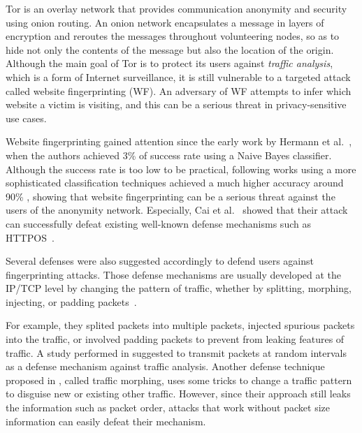 

Tor is an overlay network that provides communication anonymity and security using onion routing.
An onion network encapsulates a message in layers of encryption and reroutes the messages throughout volunteering nodes, so as to hide not only the contents of the message but also the location of the origin.
Although the main goal of Tor is to protect its users against {\it traffic analysis}, which is a form of Internet surveillance, it is still vulnerable to a targeted attack called website fingerprinting (WF).
An adversary of WF attempts to infer which website a victim is visiting, and this can be a serious threat in privacy-sensitive use cases.

Website fingerprinting gained attention since the early work by Hermann et al.~\cite{hermann}, when the authors achieved 3\% of success rate using a Naive Bayes classifier.
Although the success rate is too low to be practical, following works using a more sophisticated classification techniques achieved a much higher accuracy around 90\% \cite{panchenko11, wang2013improved, cai2012touching}, showing that website fingerprinting can be a serious threat against the users of the anonymity network.
Especially, Cai et al.~\cite{cai2012touching} showed that their attack can successfully defeat existing well-known defense mechanisms such as HTTPOS~\cite{luo2011}.

Several defenses were also suggested accordingly to defend users against fingerprinting attacks.
Those defense mechanisms are usually developed at the IP/TCP level by changing the pattern of traffic, whether by splitting, morphing, injecting, or padding packets~\cite{luo2011}.

For example, they splited packets into multiple packets, injected spurious packets into the traffic, or involved  padding packets to prevent from leaking features of traffic.
A study performed in \cite{fu2003} suggested to transmit packets at random intervals as a defense mechanism against traffic analysis.
Another defense technique proposed in \cite{wright2009}, called traffic morphing, uses some tricks to change a traffic pattern to disguise new or existing other traffic.
However, since their approach still leaks the information such as packet order, attacks that work without packet size information can easily defeat their mechanism.

